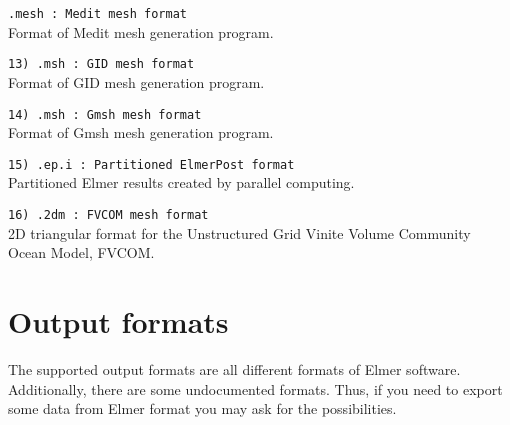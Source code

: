 \begin{description}
\item \texttt{.mesh     : Medit mesh format} \\
Format of Medit mesh generation program.

\item \texttt{13) .msh      : GID mesh format} \\
Format of GID mesh generation program.

\item \texttt{14) .msh      : Gmsh mesh format} \\
Format of Gmsh mesh generation program.

\item \texttt{15) .ep.i     : Partitioned ElmerPost format} \\
Partitioned Elmer results created by parallel computing. 

\item \texttt{16) .2dm      : FVCOM mesh format} \\
2D triangular format for the Unstructured Grid Vinite Volume Community Ocean Model, FVCOM.
  
\end{description}

\section{Output formats}
The supported output formats are all different 
formats of Elmer software. Additionally, there are some undocumented formats.
Thus, if you need to export some data from Elmer format you may
ask for the possibilities. 


